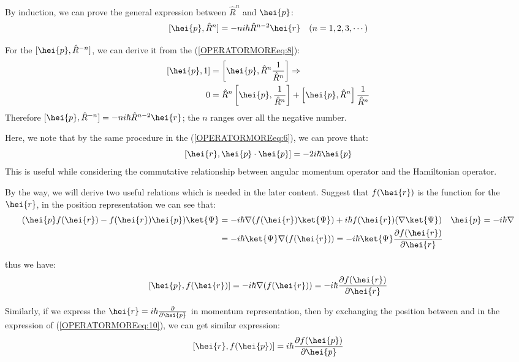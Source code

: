 By induction, we can prove the general expression between
$\hat{R}^{n}$ and $\hei{p}$:
\begin{equation}\label{OPERATORMOREeq:8}
[\hei{p}, \hat{R}^{n}] = -ni\hbar\hat{R}^{n-2}\hei{r} \quad
(n=1,2,3, \cdots)
\end{equation}

For the $[\hei{p}, \hat{R}^{-n}]$, we can derive it from the
(\ref{OPERATORMOREeq:8}):
\begin{align}\label{}
[\hei{p}, 1] &= \left[\hei{p},
\hat{R}^{n}\frac{1}{\hat{R}^{n}}\right] \Rightarrow \nonumber \\
           0 &=\hat{R}^{n}\left[\hei{p}, \frac{1}{\hat{R}^{n}}\right] +
\left[\hei{p}, \hat{R}^{n}\right]\frac{1}{\hat{R}^{n}}
\end{align}
Therefore $[\hei{p}, \hat{R}^{-n}] = -ni\hbar\hat{R}^{n-2}\hei{r}$;
the $n$ ranges over all the negative number.

Here, we note that by the same procedure in the
(\ref{OPERATORMOREeq:6}), we can prove that:
\begin{equation}\label{OPERATORMOREeq:9}
[\hei{r}, \hei{p}\cdot\hei{p}] =-2i\hbar\hei{p}
\end{equation}
This is useful while considering the commutative relationship
between angular momentum operator and the Hamiltonian operator.

By the way, we will derive two useful relations which is needed in
the later content. Suggest that $f(\hei{r})$ is the function for the
$\hei{r}$, in the position representation we can see that:
\begin{align}\label{OPERATORMOREeq:10}
(\hei{p}f(\hei{r}) - f(\hei{r})\hei{p})\ket{\Psi} &=
-i\hbar\nabla(f(\hei{r})\ket{\Psi}) + i\hbar
f(\hei{r})(\nabla\ket{\Psi}) \quad \hei{p} = -i\hbar\nabla
\nonumber \\
&=-i\hbar\ket{\Psi}\nabla(f(\hei{r})) =
-i\hbar\ket{\Psi}\frac{\partial f(\hei{r})}{\partial \hei{r}}
\end{align}

thus we have:
\begin{equation}\label{}
[\hei{p}, f(\hei{r})] = -i\hbar \nabla(f(\hei{r})) =
-i\hbar\frac{\partial f(\hei{r})}{\partial \hei{r}}
\end{equation}

Similarly, if we express the $\hei{r} =
i\hbar\frac{\partial}{\partial \hei{p}}$ in momentum representation,
then by exchanging the position between  and  in the
expression of (\ref{OPERATORMOREeq:10}), we can get similar
expression:
\begin{equation}\label{OPERATORMOREeq:11}
[\hei{r}, f(\hei{p})] = i\hbar \frac{\partial f(\hei{p})}{\partial
\hei{p}}
\end{equation}






